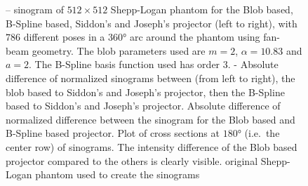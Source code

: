 \begin{figure}
	\caption{-- sinogram of \(512 \times
		512\) Shepp-Logan phantom for the Blob based, B-Spline based, Siddon's and Joseph's
		projector (left to right), with \(786\) different poses in a \(360\)° arc around the
		phantom using fan-beam geometry. The blob parameters used are \(m=2\),
		\(\alpha=10.83\) and \(a=2\). The B-Spline basis function used has order \(3\).%
		- Absolute
		difference of normalized sinograms between (from left to right), the blob based to
		Siddon's and Joseph's projector, then the B-Spline based to Siddon's and Joseph's
		projector.  Absolute difference of normalized
		difference between the sinogram for the Blob based and B-Spline based projector.%
		 Plot of cross sections at \(180\)° (i.e.\ the
		center row) of sinograms. The intensity difference of the Blob based projector
		compared to the others is clearly visible.  original
		Shepp-Logan phantom used to create the sinograms}%
	\label{fig:sinogram_shepp_logan}
\end{figure}

